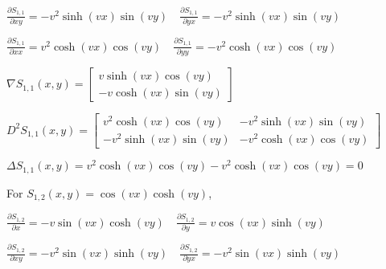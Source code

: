 \documentclass[12pt, executivepaper]{article}
\begin{document}
\begin{flushleft}
\vspace{3mm}

$\frac{\partial S_{1,1}}{\partial xy}=-v^2\sinh(vx)\sin(vy) \quad \frac{\partial S_{1,1}}{\partial yx}=-v^2\sinh(vx)\sin(vy)$ \\

\vspace{3mm}

$\frac{\partial S_{1,1}}{\partial xx}=v^2\cosh(vx)\cos(vy) \quad \frac{\partial S_{1,1}}{\partial yy}=-v^2\cosh(vx)\cos(vy)$ \\

\vspace{3mm}


$\nabla S_{1,1}(x,y)=
\begin{bmatrix}
v\sinh(vx)\cos(vy) \\
-v\cosh(vx)\sin(vy)
\end{bmatrix}$

\vspace{3mm}

$D^2 S_{1,1}(x,y)=
\begin{bmatrix}
v^2\cosh(vx)\cos(vy) & -v^2\sinh(vx)\sin(vy) \\
-v^2\sinh(vx)\sin(vy) & -v^2\cosh(vx)\cos(vy)
\end{bmatrix}$

\vspace{3mm}

$\Delta S_{1,1}(x,y)=v^2\cosh(vx)\cos(vy)-v^2\cosh(vx)\cos(vy)=0$

\vspace{3mm}

\pagebreak

\vspace*{-40mm}

For $S_{1,2}(x,y)=\cos(vx)\cosh(vy)$, \\

\vspace{3mm}

$\frac{\partial S_{1,2}}{\partial x}=-v\sin(vx)\cosh(vy) \quad \frac{\partial S_{1,2}}{\partial y}=v\cos(vx)\sinh(vy)$ \\

\vspace{3mm}

$\frac{\partial S_{1,2}}{\partial xy}=-v^2\sin(vx)\sinh(vy) \quad \frac{\partial S_{1,2}}{\partial yx}=-v^2\sin(vx)\sinh(vy)$ \\

\vspace{3mm}


\end{flushleft}
\end{document}
